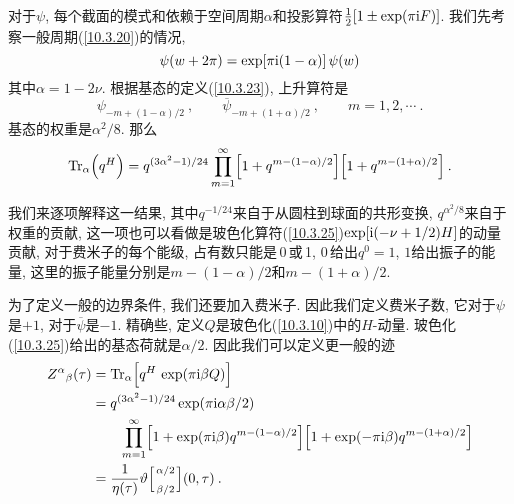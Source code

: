 对于$ \psi$, 每个截面的模式和依赖于空间周期$ \alpha $和投影算符$ \frac{1}{2}[1\pm\exp(\pi\mathrm{i} F)]$. 我们先考察一般周期(\ref{10.3.20})的情况,
\begin{equation}
    \psi(w+2\pi) =\exp[\pi\mathrm{i}(1-\alpha)]\,\psi(w) \label{10.7.4}
\end{equation}
其中$ \alpha=1-2\nu$. 根据基态的定义(\ref{10.3.23}), 上升算符是
\begin{equation}
    \psi_{-m+(1-\alpha)/2}\:,\qquad \overline{\psi}_{-m+(1+\alpha)/2}\:,   \qquad m=1,2,\cdots \:.\label{10.7.5}
\end{equation}
基态的权重是$ \alpha^{2}/8$. 那么
\begin{equation}
    \operatorname{Tr}_{\alpha}\Bigl(q^{H}\Bigr) = q^{(3\alpha^{2}-1)/24}\prod_{m=1}^{\infty}\Bigl[1+q^{m-(1-\alpha)/2}\Bigr]
    \Bigl[1+q^{m-(1+\alpha)/2}\Bigr]\:.\label{10.7.6}
\end{equation}
\begin{tcolorbox}
\noindent 我们来逐项解释这一结果, 其中$ q^{-1/24} $来自于从圆柱到球面的共形变换, $q^{\alpha^{2}/8} $来自于权重的贡献, 这一项也可以看做是玻色化算符(\ref{10.3.25})$ \exp[\mathrm{i}(-\nu+1/2)H] $的动量贡献, 对于费米子的每个能级, 占有数只能是\,0\,或\,1, 0\,给出$ q^{0}=1$, $1 $给出振子的能量, 这里的振子能量分别是$ m-(1-\alpha)/2 $和$ m-(1+\alpha)/2$.
\end{tcolorbox}
\noindent 为了定义一般的边界条件, 我们还要加入费米子. 因此我们定义费米子数, 它对于$ \psi $是$ +1$, 对于$ \overline{\psi} $是$ -1$. 精确些, 定义$ Q $是玻色化(\ref{10.3.10})中的$ H $-动量. 玻色化(\ref{10.3.25})给出的基态荷就是$ \alpha/2$. 因此我们可以定义更一般的迹
\begin{subequations} \label{10.7.7}
    \begin{align}
        Z^{\alpha}{}_{\beta}(\tau) &= \operatorname{Tr}_{\alpha}\Bigl[q^{H}\,\exp(\pi\mathrm{i} \beta Q)\Bigr]\label{10.7.7a} \\
        &= q^{(3\alpha^{2}-1)/24}\exp(\pi\mathrm{i}\alpha\beta/2) \nonumber \\
        &\qquad \prod_{m=1}^{\infty}\Bigl[1+\exp(\pi\mathrm{i}\beta)q^{m-(1-\alpha)/2}\Bigr]\Bigl[1+\exp(-\pi\mathrm{i}\beta)q^{m-(1+\alpha)/2}\Bigr]\label{10.7.7b} \\
        & =\frac{1}{\eta(\tau)}\vartheta \Bigl[
            {\scriptstyle \alpha/2  \atop \scriptstyle  \beta/2}
        \Bigr](0,\tau) \:.  \label{10.7.7c}
    \end{align} 
\end{subequations}


